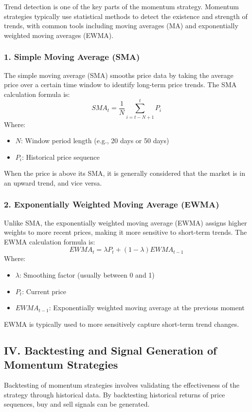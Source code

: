 \documentclass[12pt, oneside]{article}
\numberwithin{equation}{section}
\begin{document}
Trend detection is one of the key parts of the momentum strategy. Momentum strategies typically use statistical methods to detect the existence and strength of trends, with common tools including moving averages (MA) and exponentially weighted moving averages (EWMA).

\subsubsection*{1. Simple Moving Average (SMA)}

The simple moving average (SMA) smooths price data by taking the average price over a certain time window to identify long-term price trends. The SMA calculation formula is:
\[
SMA_t = \frac{1}{N} \sum_{i=t-N+1}^{t} P_i
\]
Where:
\begin{itemize}
    \item \( N \): Window period length (e.g., 20 days or 50 days)
    \item \( P_i \): Historical price sequence
\end{itemize}
When the price is above its SMA, it is generally considered that the market is in an upward trend, and vice versa.

\subsubsection*{2. Exponentially Weighted Moving Average (EWMA)}

Unlike SMA, the exponentially weighted moving average (EWMA) assigns higher weights to more recent prices, making it more sensitive to short-term trends. The EWMA calculation formula is:
\[
EWMA_t = \lambda P_t + (1 - \lambda) EWMA_{t-1}
\]
Where:
\begin{itemize}
    \item \( \lambda \): Smoothing factor (usually between 0 and 1)
    \item \( P_t \): Current price
    \item \( EWMA_{t-1} \): Exponentially weighted moving average at the previous moment
\end{itemize}
EWMA is typically used to more sensitively capture short-term trend changes.

\subsection*{IV. Backtesting and Signal Generation of Momentum Strategies}

Backtesting of momentum strategies involves validating the effectiveness of the strategy through historical data. By backtesting historical returns of price sequences, buy and sell signals can be generated.
\end{document}

